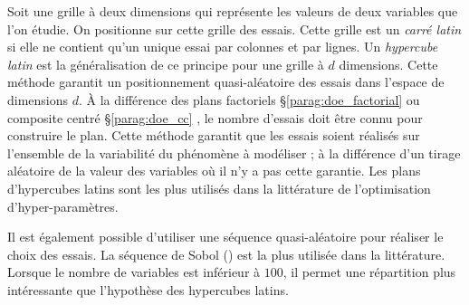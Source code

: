 Soit une grille à deux dimensions qui représente les valeurs de deux variables que l'on étudie.
On positionne sur cette grille des essais.
Cette grille est un \textit{carré latin} si elle ne contient qu'un unique essai par colonnes et par lignes.
Un \textit{hypercube latin} est la généralisation de ce principe pour une grille à $d$ dimensions.
Cette méthode garantit un positionnement quasi-aléatoire des essais dans l'espace de dimensions $d$.
À la différence des plans factoriels §\ref{parag:doe_factorial} ou composite centré §\ref{parag:doe_cc} , le nombre d'essais doit être connu pour construire le plan.
Cette méthode garantit que les essais soient réalisés sur l'ensemble de la variabilité du phénomène à modéliser ; à la différence d'un tirage aléatoire de la valeur des variables où il n'y a pas cette garantie.
Les plans d'hypercubes latins sont les plus utilisés dans la littérature de l'optimisation d'hyper-paramètres.

Il est également possible d'utiliser une séquence quasi-aléatoire pour réaliser le choix des essais.
La séquence de Sobol (\cite{sobol_distribution_1967}) est la plus utilisée dans la littérature.
Lorsque le nombre de variables est inférieur à $100$, il permet une répartition plus intéressante que l'hypothèse des hypercubes latins.

